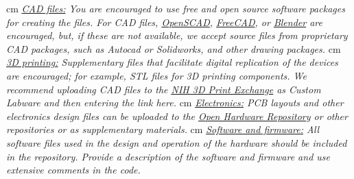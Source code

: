\documentclass[11pt, letterpaper]{article}
\begin{document}
%
 cm
\noindent
\textit{\underline{CAD files:} You are encouraged to use free and open source software packages for creating the files. For CAD files, \href{http://www.openscad.org/}{OpenSCAD}, \href{http://www.freecadweb.org/}{FreeCAD}, or \href{https://www.blender.org/}{Blender} are encouraged, but, if these are not available, we accept source files from proprietary CAD packages, such as Autocad or Solidworks, and other drawing packages.} 
 cm
\noindent
\textit{\underline{3D printing:} Supplementary files that facilitate digital replication of the devices are encouraged;  for example, STL files for 3D printing components. We recommend uploading CAD files to the \href{http://3dprint.nih.gov/}{\underline{NIH 3D Print Exchange}} as Custom Labware and then entering the link here.} 
 cm
\noindent
\textit{\underline{Electronics:} PCB layouts and other electronics design files can be uploaded to the \href{http://www.ohwr.org/}{\underline{Open Hardware Repository}} or other repositories or as supplementary materials.} 
 cm
\noindent
\textit{\underline{Software and firmware:} All software files used in the design and operation of the hardware should be included in the repository. Provide a description of the software and firmware and use extensive comments in the code.}
\end{document}
